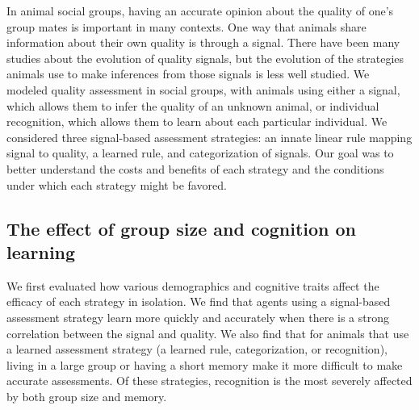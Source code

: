 In animal social groups, having an accurate opinion about the quality of one's group mates is important in many contexts. One way that animals share information about their own quality is through a signal. There have been many studies about the evolution of quality signals, but the evolution of the strategies animals use to make inferences from those signals is less well studied. We modeled quality assessment in social groups, with animals using either a signal, which allows them to infer the quality of an unknown animal, or individual recognition, which allows them to learn about each particular individual. We considered three signal-based assessment strategies: an innate linear rule mapping signal to quality, a learned rule, and categorization of signals. Our goal was to better understand the costs and benefits of each strategy and the conditions under which each strategy might be favored. 


\subsection*{The effect of group size and cognition on learning} 
We first evaluated how various demographics and cognitive traits affect the efficacy of each strategy in isolation. We  find that agents using a signal-based assessment strategy learn more quickly and accurately when there is a strong correlation between the signal and quality. We also find that for animals that use a learned assessment strategy (a learned rule, categorization, or recognition), living in a large group or having a short memory make it more difficult to make accurate assessments. Of these strategies, recognition is the most severely affected by both group size and memory.  

